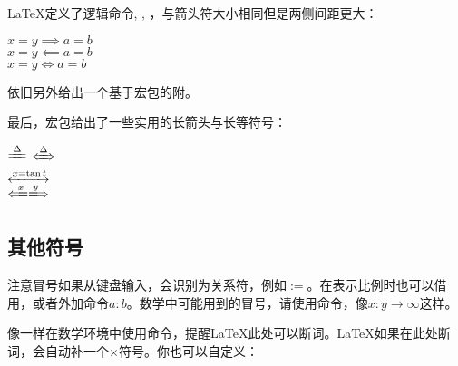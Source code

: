 \LaTeX 定义了逻辑命令, , ，与箭头符大小相同但是两侧间距更大：
\begin{codeshow}
$x=y \implies a=b$\\
$x=y \impliedby a=b$\\
$x=y \iff a=b$
\end{codeshow}

依旧另外给出一个基于宏包的附。
\begin{table}[!htb]
\centering
\caption{amssymb箭头}
\label{tab:amsarrow}
\renewcommand\arraystretch{1}
\end{table}

最后，宏包给出了一些实用的长箭头与长等符号：

\begin{codeshow}
$\xlongequal{\Delta}$\quad
$\xLeftrightarrow{\Delta}$\\
$\xleftrightarrow{x=\tan t}$\\
$\xLongleftarrow{x} \xLongrightarrow{y}$
\end{codeshow}

\subsection{其他符号}
注意冒号如果从键盘输入，会识别为关系符，例如$:=$。在表示比例时也可以借用，或者外加命令$a\mathbin{:}b$。数学中可能用到的冒号，请使用命令，像$x\colon y\to\infty$这样。

像\latexline{\-}一样在数学环境中使用\latexline{*}命令，提醒\LaTeX 此处可以断词。\LaTeX 如果在此处断词，会自动补一个$\times$符号。你也可以自定义：
\begin{latex}
\renewcommand{\*}{discretionaty{\,\mbox{$\cdot$}}{}{}}
\end{latex}

